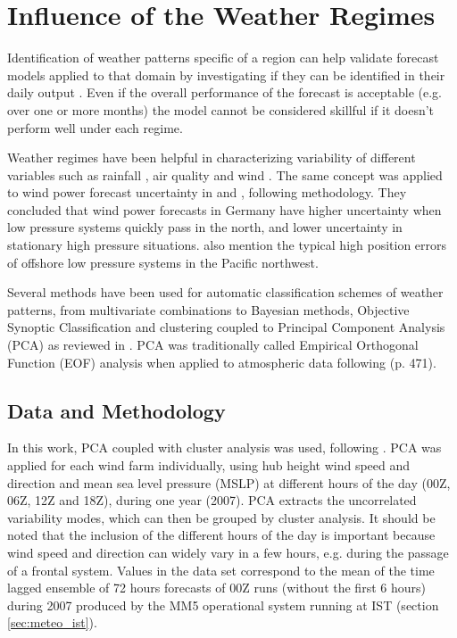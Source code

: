 \FloatBarrier
\section{Influence of the Weather Regimes}
\label{sec:regimes}

Identification of weather patterns specific of a region can help validate forecast models applied to that domain by investigating if they can be identified in their daily output \citep{CorteReal1998}. Even if the overall performance of the forecast is acceptable (e.g. over one or more months) the model cannot be considered skillful if it doesn't perform well under each regime.

Weather regimes have been helpful in characterizing variability of different variables such as rainfall \citep{CorteReal1998, TrigoCamara2000, Santos2005}, air quality \citep{Shahgedanova1998, BeaverPalazoglu2006} and wind \citep{Soriano2006}. The same concept was applied to wind power forecast uncertainty in \cite{LangeHeinemann2003} and \cite{LangeFocken2005}, following \cite{Shahgedanova1998} methodology. They concluded that wind power forecasts in Germany have higher uncertainty when low pressure systems quickly pass in the north, and lower uncertainty in stationary high pressure situations. \cite{McMurdieCasola2009} also mention the typical high position errors of offshore low pressure systems in the Pacific northwest.

Several methods have been used for automatic classification schemes of weather patterns, from multivariate combinations to Bayesian methods, Objective Synoptic Classification and clustering coupled to Principal Component Analysis (PCA) as reviewed in \cite{Soriano2006}. PCA was traditionally called Empirical Orthogonal Function (EOF) analysis when applied to atmospheric data following \cite{Wilks2005} (p. 471).

\subsection{Data and Methodology}

In this work, PCA coupled with cluster analysis was used, following \cite{LangeFocken2005}. PCA was applied for each wind farm individually, using hub height wind speed and direction and mean sea level pressure (MSLP) at different hours of the day (00Z, 06Z, 12Z and 18Z), during one year (2007). PCA extracts the uncorrelated variability modes, which can then be grouped by cluster analysis. It should be noted that the inclusion of the different hours of the day is important because wind speed and direction can widely vary in a few hours, e.g. during the passage of a frontal system. Values in the data set correspond to the mean of the time lagged ensemble of 72 hours forecasts of 00Z runs (without the first 6 hours) during 2007 produced by the MM5 operational system running at IST (section \ref{sec:meteo_ist}). 

